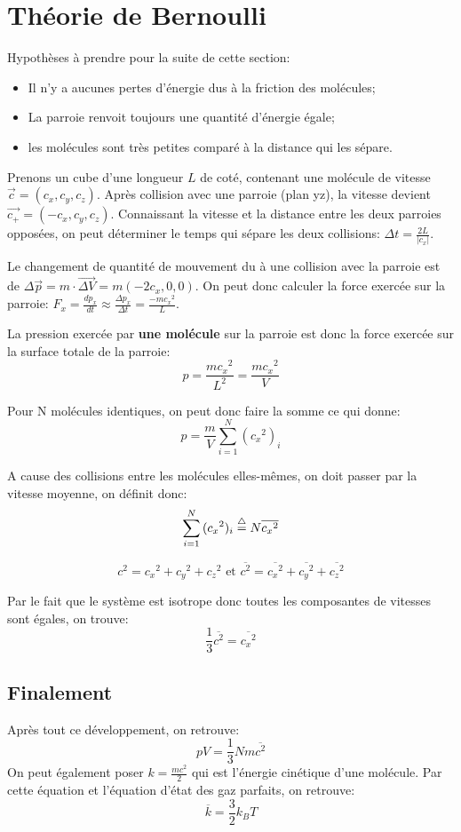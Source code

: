 \section{Théorie de Bernoulli}
Hypothèses à prendre pour la suite de cette section:
\begin{itemize}
 \item Il n'y a aucunes pertes d'énergie dus à la friction des molécules;
 \item La parroie renvoit toujours une quantité d'énergie égale;
 \item les molécules sont très petites comparé à la distance qui les sépare.
\end{itemize}


Prenons un cube d'une longueur $L$ de coté, contenant une molécule de vitesse $\vec{c} = (c_x, c_y, c_z)$. Après collision avec une parroie (plan yz), la vitesse devient $\vec{c_+} = (-c_x, c_y, c_z)$.
Connaissant la vitesse et la distance entre les deux parroies opposées, on peut déterminer le temps qui sépare les deux collisions: $\Delta t = \frac{2L}{|c_x|}$.

Le changement de quantité de mouvement du à une collision avec la parroie est de $\Delta \vec{p} = m \cdot \vec{\Delta V} = m(-2c_x, 0, 0)$. On peut donc calculer la force exercée sur la parroie: $F_x = \frac{dp_x}{dt} \approx \frac{\Delta p_x}{\Delta t} = \frac{-m{c_x}^2}{L}$.

La pression exercée par {\bf une molécule} sur la parroie est donc la force exercée sur la surface totale de la parroie: $$p = \frac{m{c_x}^2}{L^2} = \frac{m{c_x}^2}{V}$$

Pour N molécules identiques, on peut donc faire la somme ce qui donne:
$$p = \frac{m}{V} \sum_{i=1}^{N}{({c_x}^2)_i}$$

A cause des collisions entre les molécules elles-mêmes, on doit passer par la vitesse moyenne, on définit donc: $$ \sum_{i=1}^{N}{({c_x}^2)_i} \buildrel\triangle\over = N \overline{{c_x}^2}$$ 


$$c^2 = {c_x}^2 + {c_y}^2 + {c_z}^2 \textrm{ et }\overline{c^2} = \overline{{c_x}^2} + \overline{{c_y}^2} + \overline{{c_z}^2}$$

Par le fait que le système est isotrope donc toutes les composantes de vitesses sont égales, on trouve: 
$$ \frac{1}{3}\overline{c^2} = \overline{{c_x}^2} $$

\subsection{Finalement}
Après tout ce développement, on retrouve:
$$pV = \frac{1}{3}Nm\overline{c^2}$$
On peut également poser $k = \frac{mc^2}{2}$ qui est l'énergie cinétique d'une molécule.
Par cette équation et l'équation d'état des gaz parfaits, on retrouve:
$$\overline{k} = \frac{3}{2}k_B T$$


